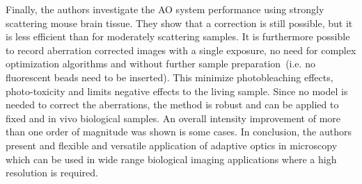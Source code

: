 Finally, the authors investigate the AO system performance using strongly scattering mouse brain tissue. They show that a correction is still possible, but it is less efficient than for moderately scattering samples. It is furthermore possible to record aberration corrected images with a single exposure, no need for complex optimization algorithms and without further sample preparation~(i.e. no fluorescent beads need to be inserted). This minimize photobleaching effects, photo-toxicity and limits negative effects to the living sample. Since no model is needed to correct the aberrations, the method is robust and can be applied to fixed and in vivo biological samples. An overall intensity improvement of more than one order of magnitude was shown is some cases. 
In conclusion, the authors present and flexible and versatile application of adaptive optics in microscopy which can be used in wide range biological imaging applications where a high resolution is required. 

